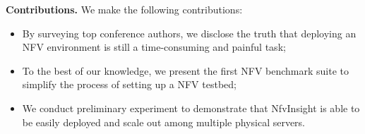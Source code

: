 \textbf{Contributions.} We make the following contributions:
\begin{itemize}
\item
By surveying top conference authors, we disclose the truth that deploying an NFV environment is still a 
time-consuming and painful task;
\item
To the best of our knowledge, we present the first NFV benchmark suite to simplify the process of
setting up a NFV testbed;
\item
We conduct preliminary experiment to demonstrate that NfvInsight is able to be easily deployed and scale out
among multiple physical servers.
\end{itemize}


%
%
